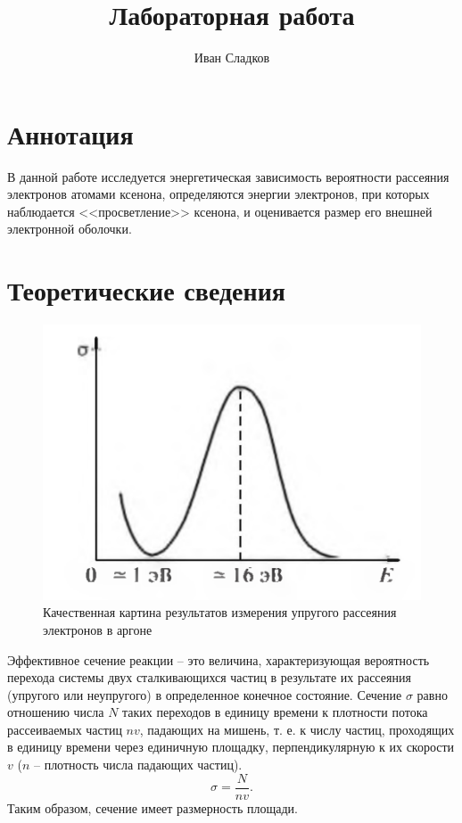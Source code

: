 \documentclass[a4paper]{article}
\title{Лабораторная работа \labnum \space \labname} %
\author{Иван Сладков}
\begin{document}
\maketitle
\thispagestyle{empty}
\section{Аннотация}
В данной работе исследуется энергетическая зависимость вероятности рассеяния электронов атомами ксенона, определяются энергии электронов, при которых наблюдается <<просветление>> ксенона, и оценивается размер его внешней электронной оболочки.

\section{Теоретические сведения}

\begin{figure}
	\includegraphics[width=1.0\linewidth]{Screenshot_1}
	\caption{Качественная картина результатов измерения упругого рассеяния электронов в аргоне}
	\label{fig:screenshot1}
\end{figure}
Эффективное сечение реакции -- это величина, характеризующая вероятность перехода системы двух сталкивающихся частиц в результате их рассеяния (упругого или неупругого) в определенное конечное состояние. Сечение $ \sigma $ равно отношению числа $ N $ таких переходов в единицу времени к плотности потока рассеиваемых частиц $ n v $, падающих на мишень, т. е. к числу частиц, проходящих в единицу времени через единичную площадку, перпендикулярную к их скорости $ v $ ($ n $ -- плотность числа падающих частиц).
\begin{equation}\label{eq:sigma}
	\sigma = \frac{N}{n v}.
\end{equation}
Таким образом, сечение имеет размерность площади.
\end{document}

